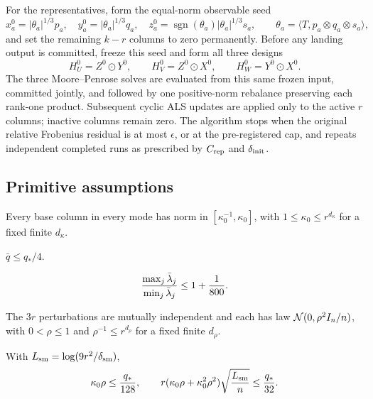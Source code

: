For the representatives, form the equal-norm observable seed
\[
 x_a^0=|\theta_a|^{1/3}p_a,\quad y_a^0=|\theta_a|^{1/3}q_a,\quad
 z_a^0=\operatorname{sgn}(\theta_a)|\theta_a|^{1/3}s_a,
 \qquad \theta_a=\langle T,p_a\otimes q_a\otimes s_a\rangle,
\]
and set the remaining $k-r$ columns to zero permanently. Before any
landing output is committed, freeze this seed and form all three designs
\[
 H_U^0=Z^0\odot Y^0,\qquad H_V^0=Z^0\odot X^0,\qquad
 H_W^0=Y^0\odot X^0.
\]
The three Moore--Penrose solves are evaluated from this same frozen input,
committed jointly, and followed by one positive-norm rebalance preserving
each rank-one product. Subsequent cyclic ALS updates are applied only to the
active $r$ columns; inactive columns remain zero. The algorithm stops when
the original relative Frobenius residual is at most $\epsilon$, or at the
pre-registered cap, and repeats independent completed runs as prescribed by
$C_{\rm rep}$ and $\delta_{\rm init}$.

\subsection{Primitive assumptions}

\begin{assumption}\label{assump:base-scale}
Every base column in every mode has norm in
$[\kappa _0^{-1},\kappa _0]$, with
$1\le\kappa _0\le r^{d_\kappa}$ for a fixed finite $d_\kappa$.
\end{assumption}

\begin{assumption}\label{assump:cumulative-gram}
$\bar q\le q_*/4$.
\end{assumption}

\begin{assumption}\label{assump:base-weight-balance}
\[
 {\max_j\bar\lambda_j\over\min_j\bar\lambda_j}\le1+{1\over800}.
\]
\end{assumption}

\begin{assumption}\label{assump:gaussian-smoothing}
The $3r$ perturbations are mutually independent and each has law
${\cal N}(0,\rho^2I_n/n)$, with $0<\rho\le1$ and
$\rho^{-1}\le r^{d_\rho}$ for a fixed finite $d_\rho$.
\end{assumption}

\begin{assumption}\label{assump:smoothing-margin}
With $L_{\rm sm}=\log(9r^2/\delta_{\rm sm})$,
\[
 \kappa _0\rho\le {q_*\over128},\qquad
 r(\kappa _0\rho+\kappa _0^2\rho^2)
 \sqrt{\frac{L_{\rm sm}}n}\le {q_*\over32}.
\]
\end{assumption}


